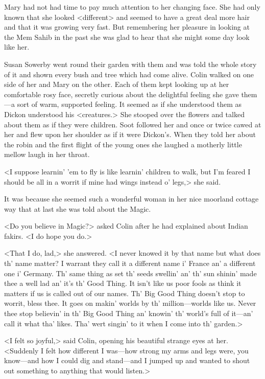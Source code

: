 Mary had not had time to pay much attention to her changing face. She had only known that she looked <different> and seemed to have a great deal more hair and that it was growing very fast. But remembering her pleasure in looking at the Mem Sahib in the past she was glad to hear that she might some day look like her.

Susan Sowerby went round their garden with them and was told the whole story of it and shown every bush and tree which had come alive. Colin walked on one side of her and Mary on the other. Each of them kept looking up at her comfortable rosy face, secretly curious about the delightful feeling she gave them—a sort of warm, supported feeling. It seemed as if she understood them as Dickon understood his <creatures.> She stooped over the flowers and talked about them as if they were children. Soot followed her and once or twice cawed at her and flew upon her shoulder as if it were Dickon's. When they told her about the robin and the first flight of the young ones she laughed a motherly little mellow laugh in her throat.

<I suppose learnin' 'em to fly is like learnin' children to walk, but I'm feared I should be all in a worrit if mine had wings instead o' legs,> she said.

It was because she seemed such a wonderful woman in her nice moorland cottage way that at last she was told about the Magic.

<Do you believe in Magic?> asked Colin after he had explained about Indian fakirs. <I do hope you do.>

<That I do, lad,> she answered. <I never knowed it by that name but what does th' name matter? I warrant they call it a different name i' France an' a different one i' Germany. Th' same thing as set th' seeds swellin' an' th' sun shinin' made thee a well lad an' it's th' Good Thing. It isn't like us poor fools as think it matters if us is called out of our names. Th' Big Good Thing doesn't stop to worrit, bless thee. It goes on makin' worlds by th' million—worlds like us. Never thee stop believin' in th' Big Good Thing an' knowin' th' world's full of it—an' call it what tha' likes. Tha' wert singin' to it when I come into th' garden.>

<I felt so joyful,> said Colin, opening his beautiful strange eyes at her. <Suddenly I felt how different I was—how strong my arms and legs were, you know—and how I could dig and stand—and I jumped up and wanted to shout out something to anything that would listen.>

